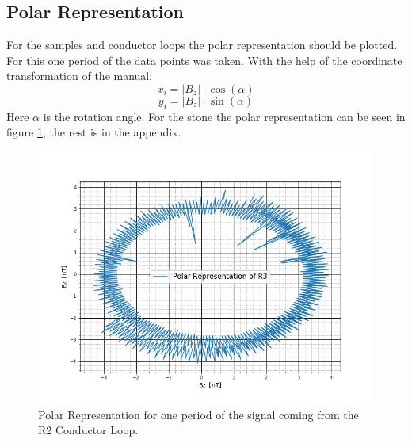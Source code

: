 \subsection{Polar Representation}
For the samples and conductor loops the polar representation should be plotted. For this one period of the data points was taken. With the help of the coordinate transformation of the manual\cite{anleitung}:
\begin{equation}
	x_i=|B_z|\cdot \cos(\alpha)
\end{equation}
\begin{equation}
	y_i=|B_z|\cdot \sin(\alpha)
\end{equation}
Here $\alpha$ is the rotation angle. For the stone the polar representation can be seen in figure \ref{Stone}, the rest is in the appendix.
\begin{figure}[ht]
	\includegraphics[scale=0.5]{Bild/R3}
	\centering
	\caption[Polar Representation for R2 Conductor Loop]{Polar Representation for one period of the signal coming from the R2 Conductor Loop.}
	\label{Stone}
\end{figure}\\